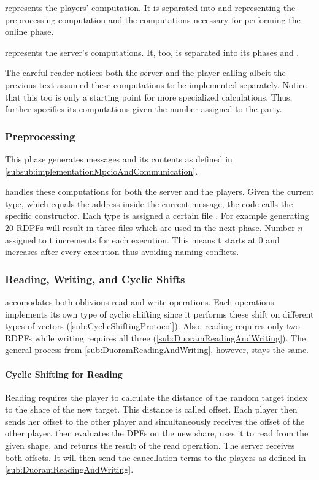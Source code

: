  represents the players' computation.
It is separated into  and  representing the preprocessing computation and the computations necessary for performing the online phase.

 represents the server's computations.
It, too, is separated into its phases  and .

The careful reader notices both the server and the player calling  albeit the previous text assumed these computations to be implemented separately.
Notice that this too is only a starting point for more specialized calculations.
Thus,  further specifies its computations given the number assigned to the party.

\subsubsection*{Preprocessing} \label{subsub:implementationPreprocessing}
This phase generates messages and its contents as defined in \ref{subsub:implementationMpcioAndCommunication}.

 handles these computations for both the server and the players.
Given the current type, which equals the address inside the current message, the code calls the specific constructor.
Each type is assigned a certain file .
For example generating 20 RDPFs will result in three files  which are used in the next phase.
Number $n$ assigned to t increments for each execution.
This means t starts at 0 and increases after every execution thus avoiding naming conflicts.

\subsubsection*{Reading, Writing, and Cyclic Shifts} \label{subsub:implementationCyclicShifting}
 accomodates both oblivious read and write operations.
Each operations implements its own type of cyclic shifting since it performs these shift on different types of vectors (\ref{sub:CyclicShiftingProtocol}).
Also, reading requires only two RDPFs while writing requires all three (\ref{sub:DuoramReadingAndWriting}).
The general process from \ref{sub:DuoramReadingAndWriting}, however, stays the same.

\paragraph{Cyclic Shifting for Reading}
Reading requires the player to calculate the distance of the random target index to the share of the new target.
This distance is called offset.
Each player then sends her offset to the other player and simultaneously receives the offset of the other player.
 then evaluates the DPFs on the new share, uses it to read from the given shape, and returns the result of the read operation.
The server receives both offsets.
It will then send the cancellation terms to the players as defined in \ref{sub:DuoramReadingAndWriting}.

